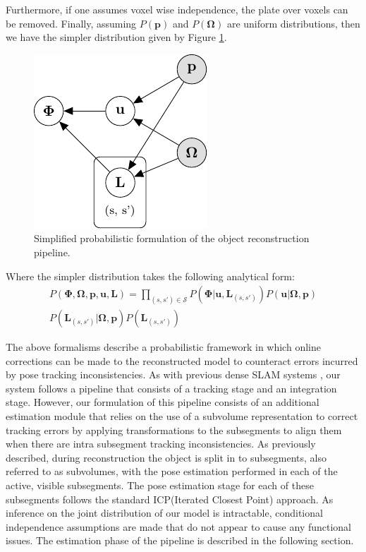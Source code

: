 Furthermore, if one assumes voxel wise independence, the plate over voxels can be removed. Finally, assuming $P(\mathbf{p})$ and 
$P(\mathbf{\Omega})$ are uniform distributions, then we have the simpler distribution given by Figure \ref{pgm2}.
\begin{figure}[h]
	\centering
	\includegraphics{graphical_models/pgm2.pdf}
	\caption{Simplified probabilistic formulation of the object reconstruction pipeline.}
	\label{pgm2}
\end{figure}

Where the simpler distribution takes the following analytical form:
\begin{equation}
\begin{split}
P(\mathbf{\Phi}, \mathbf{\Omega}, \mathbf{p}, \mathbf{u}, \mathbf{L}) = 
\prod_{(s, s') \in \mathcal{S}} P(\mathbf{\Phi}|\mathbf{u}, \mathbf{L}_{(s, s')})
P(\mathbf{u}|\mathbf{\Omega}, \mathbf{p})\\
P(\mathbf{L}_{(s, s')}|\mathbf{\Omega}, \mathbf{p})
P(\mathbf{L}_{(s, s')})
\end{split}
\end{equation}

The above formalisms describe a probabilistic framework in which online corrections can be made to the reconstructed model to counteract 
errors incurred by pose tracking inconsistencies. As with previous dense SLAM systems \cite{Newcombe2011, Prisacariu2014, Niessner2013}, 
our system follows a pipeline that consists of a tracking stage and an integration stage. However, our formulation of this pipeline 
consists of an additional estimation module that relies on the use of a subvolume representation to correct tracking errors by applying 
transformations to the subsegments to align them when there are intra subsegment tracking inconsistencies. 
As previously described, during reconstruction the object is split in to subsegments, also referred to as subvolumes, 
with the pose estimation performed in each of the active, visible subsegments. The pose estimation stage for each of these subsegments follows 
the standard ICP(Iterated Closest Point) approach.
As inference on the joint distribution of our model is intractable, conditional independence assumptions are made that do not appear 
to cause any functional issues. The estimation phase of the pipeline is described in the following section.

